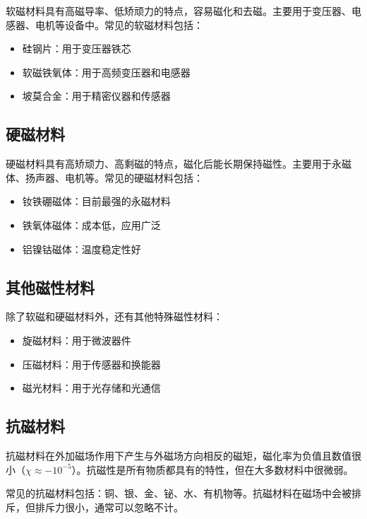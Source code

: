 \documentclass[12pt,UTF8]{ctexbook}
\begin{document}
软磁材料具有高磁导率、低矫顽力的特点，容易磁化和去磁。主要用于变压器、电感器、电机等设备中。常见的软磁材料包括：

\begin{itemize}[leftmargin=2cm]
    \item 硅钢片：用于变压器铁芯
    \item 软磁铁氧体：用于高频变压器和电感器
    \item 坡莫合金：用于精密仪器和传感器
\end{itemize}

\subsection{硬磁材料}

硬磁材料具有高矫顽力、高剩磁的特点，磁化后能长期保持磁性。主要用于永磁体、扬声器、电机等。常见的硬磁材料包括：

\begin{itemize}[leftmargin=2cm]
    \item 钕铁硼磁体：目前最强的永磁材料
    \item 铁氧体磁体：成本低，应用广泛
    \item 铝镍钴磁体：温度稳定性好
\end{itemize}

\subsection{其他磁性材料}

除了软磁和硬磁材料外，还有其他特殊磁性材料：

\begin{itemize}[leftmargin=2cm]
    \item 旋磁材料：用于微波器件
    \item 压磁材料：用于传感器和换能器
    \item 磁光材料：用于光存储和光通信
\end{itemize}

\subsection{抗磁材料}

抗磁材料在外加磁场作用下产生与外磁场方向相反的磁矩，磁化率为负值且数值很小（$\chi \approx -10^{-5}$）。抗磁性是所有物质都具有的特性，但在大多数材料中很微弱。

常见的抗磁材料包括：铜、银、金、铋、水、有机物等。抗磁材料在磁场中会被排斥，但排斥力很小，通常可以忽略不计。
\end{document}
